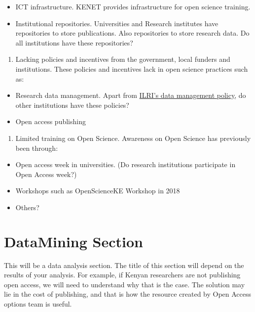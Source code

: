\begin{itemize}
\tightlist
\item
  ICT infrastructure. KENET provides infrastructure for open science
  training.
\item
  Institutional repositories. Universities and Research institutes have
  repositories to store publications. Also repositories to store
  research data. Do all institutions have these repositories?
\end{itemize}

\begin{enumerate}
\def\labelenumi{\arabic{enumi}.}
\setcounter{enumi}{1}
\tightlist
\item
  Lacking policies and incentives from the government, local funders and
  institutions. These policies and incentives lack in open science
  practices such as:
\end{enumerate}

\begin{itemize}
\tightlist
\item
  Research data management. Apart from
  \href{https://cgspace.cgiar.org/handle/10568/63496}{ILRI's data
  management policy}, do other institutions have these policies?
\item
  Open access publishing
\end{itemize}

\begin{enumerate}
\def\labelenumi{\arabic{enumi}.}
\setcounter{enumi}{2}
\tightlist
\item
  Limited training on Open Science. Awareness on Open Science has
  previously been through:
\end{enumerate}

\begin{itemize}
\tightlist
\item
  Open access week in universities. (Do research institutions
  participate in Open Access week?)
\item
  Workshops such as OpenScienceKE Workshop in 2018
\item
  Others?
\end{itemize}

\section*{DataMining Section}\label{datamining-section}

This will be a data analysis section. The title of this section will
depend on the results of your analysis. For example, if Kenyan
researchers are not publishing open access, we will need to understand
why that is the case. The solution may lie in the cost of publishing,
and that is how the resource created by Open Access options team is
useful.

